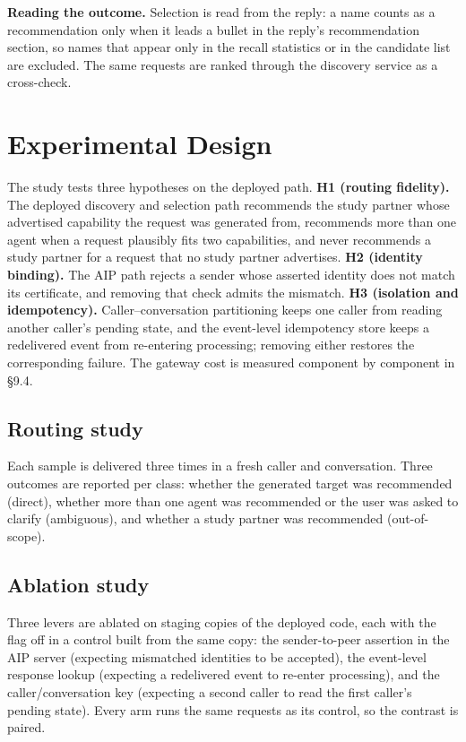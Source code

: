 \documentclass[runningheads,a4paper]{llncs}
\begin{document}
\textbf{Reading the outcome.} Selection is read from the reply: a name counts as a recommendation only when it leads a bullet in the reply's recommendation section, so names that appear only in the recall statistics or in the candidate list are excluded. The same requests are ranked through the discovery service as a cross-check.

\section{Experimental Design}

The study tests three hypotheses on the deployed path. \textbf{H1 (routing fidelity).} The deployed discovery and selection path recommends the study partner whose advertised capability the request was generated from, recommends more than one agent when a request plausibly fits two capabilities, and never recommends a study partner for a request that no study partner advertises. \textbf{H2 (identity binding).} The AIP path rejects a sender whose asserted identity does not match its certificate, and removing that check admits the mismatch. \textbf{H3 (isolation and idempotency).} Caller--conversation partitioning keeps one caller from reading another caller's pending state, and the event-level idempotency store keeps a redelivered event from re-entering processing; removing either restores the corresponding failure. The gateway cost is measured component by component in §9.4.

\subsection{Routing study}

Each sample is delivered three times in a fresh caller and conversation. Three outcomes are reported per class: whether the generated target was recommended (direct), whether more than one agent was recommended or the user was asked to clarify (ambiguous), and whether a study partner was recommended (out-of-scope).

\subsection{Ablation study}

Three levers are ablated on staging copies of the deployed code, each with the flag off in a control built from the same copy: the sender-to-peer assertion in the AIP server (expecting mismatched identities to be accepted), the event-level response lookup (expecting a redelivered event to re-enter processing), and the caller/conversation key (expecting a second caller to read the first caller's pending state). Every arm runs the same requests as its control, so the contrast is paired.
\end{document}
